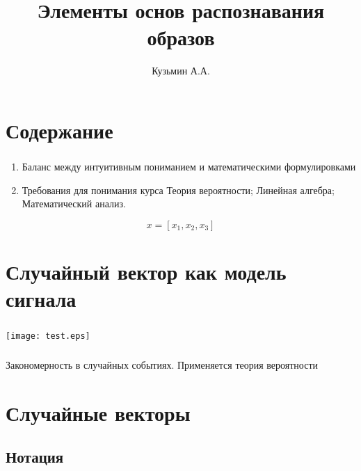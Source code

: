 \documentclass{beamer}
\title{Элементы основ распознавания образов}
\author{Кузьмин А.А.}
\institute[]{\url{http://rfe.bsu.by/}}
\begin{document}
\begin{frame}
  \maketitle
\end{frame}

\section{Содержание}

\begin{frame} \label{cont}
  \frametitle{\insertsection}
  
  \begin{enumerate}
  \item Баланс между интуитивным пониманием и математическими формулировками \pause
  \item Требования для понимания курса \pause
    Теория вероятности;
    Линейная алгебра;
    Математический анализ.
  \end{enumerate}
  
  \begin{equation}
    x = [x_1, x_2, x_3]    
  \end{equation}
\end{frame}

\section{Случайный вектор как модель сигнала}

\begin{frame}
  \frametitle{\insertsection}
  \framesubtitle{\insertsubsection}
  \texttt{[image: test.eps]}
\end{frame}

\begin{frame}
  \frametitle{\insertsection}
  \framesubtitle{\insertsubsection}
  Закономерность в случайных событиях. Применяется теория вероятности
\end{frame}

\section{Случайные векторы}
\subsection{Нотация}

\begin{frame}
  \frametitle{\insertsection}
  \framesubtitle{\insertsubsection}
  
\end{frame}
\end{document}
